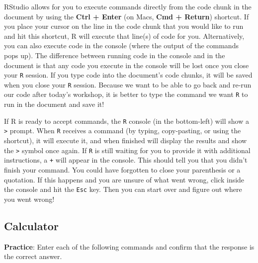 \documentclass[]{article}
\newenvironment{Shaded}{\begin{snugshade}}{\end{snugshade}}
\newcommand{\KeywordTok}[1]{\textcolor[rgb]{0.13,0.29,0.53}{\textbf{#1}}}
\newcommand{\DecValTok}[1]{\textcolor[rgb]{0.00,0.00,0.81}{#1}}
\newcommand{\FloatTok}[1]{\textcolor[rgb]{0.00,0.00,0.81}{#1}}
\newcommand{\StringTok}[1]{\textcolor[rgb]{0.31,0.60,0.02}{#1}}
\newcommand{\OperatorTok}[1]{\textcolor[rgb]{0.81,0.36,0.00}{\textbf{#1}}}
\newcommand{\NormalTok}[1]{#1}
\begin{document}
RStudio allows for you to execute commands directly from the code chunk
in the document by using the \textbf{Ctrl + Enter} (on Macs, \textbf{Cmd
+ Return}) shortcut. If you place your cursor on the line in the code
chunk that you would like to run and hit this shortcut, R will execute
that line(s) of code for you. Alternatively, you can also execute code
in the console (where the output of the commands pops up). The
difference between running code in the console and in the document is
that any code you execute in the console will be lost once you close
your \texttt{R} session. If you type code into the document's code
chunks, it will be saved when you close your \texttt{R} session. Because
we want to be able to go back and re-run our code after today's
workshop, it is better to type the command we want \texttt{R} to run in
the document and save it!

If R is ready to accept commands, the \texttt{R} console (in the
bottom-left) will show a \texttt{\textgreater{}} prompt. When \texttt{R}
receives a command (by typing, copy-pasting, or using the shortcut), it
will execute it, and when finished will display the results and show the
\texttt{\textgreater{}} symbol once again. If \texttt{R} is still
waiting for you to provide it with additional instructions, a \texttt{+}
will appear in the console. This should tell you that you didn't finish
your command. You could have forgotten to close your parenthesis or a
quotation. If this happens and you are unsure of what went wrong, click
inside the console and hit the \texttt{Esc} key. Then you can start over
and figure out where you went wrong!

\subsection{Calculator}\label{calculator}

\textbf{Practice}: Enter each of the following commands and confirm that
the response is the correct answer.

\vspace{0.25cm}

\begin{Shaded}
\end{Shaded}
\end{document}
